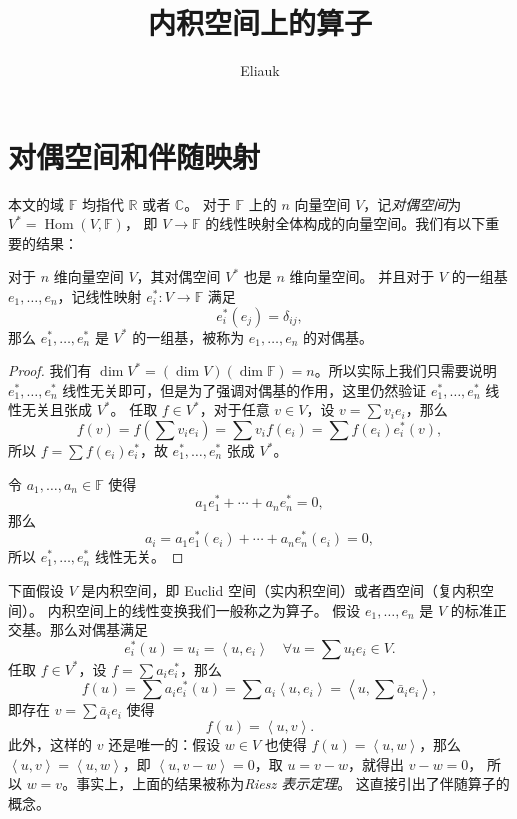 \documentclass[fontset=none,zihao=-4]{Notes}
\title{\sffamily 内积空间上的算子}
\author{Eliauk}
\DeclareMathOperator\Hom{Hom}
\newcommand{\inn}[1]{\left\langle#1\right\rangle}
\begin{document}
\maketitle

\tableofcontents

\section{对偶空间和伴随映射}

本文的域 $\mathbb{F}$ 均指代 $\mathbb{R}$ 或者 $\mathbb{C}$。
对于 $\mathbb{F}$ 上的 $n$ 向量空间 $V$，记\emph{对偶空间}为 $V^*=\Hom(V,\mathbb{F})$，
即 $V\to\mathbb{F}$ 的线性映射全体构成的向量空间。我们有以下重要的结果：

\begin{theorem}
  对于 $n$ 维向量空间 $V$，其对偶空间 $V^*$ 也是 $n$ 维向量空间。
  并且对于 $V$ 的一组基 $e_1,\dots,e_n$，记线性映射 $e_i^*:V\to\mathbb{F}$
  满足
  \[
    e_i^*(e_j)=\delta_{ij},  
  \]
  那么 $e_1^*,\dots,e_n^*$ 是 $V^*$ 的一组基，被称为 $e_1,\dots,e_n$
  的对偶基。
\end{theorem}
\begin{proof}
  我们有 $\dim V^*=(\dim V)(\dim\mathbb{F})=n$。所以实际上我们只需要说明 $e_1^*,\dots,e_n^*$
  线性无关即可，但是为了强调对偶基的作用，这里仍然验证 $e_1^*,\dots,e_n^*$ 线性无关且张成 $V^*$。
  任取 $f\in V^*$，对于任意 $v\in V$，设 $v=\sum v_ie_i$，那么
  \[
    f(v)=f\left(\sum v_ie_i\right)=\sum v_if(e_i)=\sum f(e_i)e_i^*(v),
  \]
  所以 $f=\sum f(e_i)e_i^*$，故 $e_1^*,\dots,e_n^*$ 张成 $V^*$。

  令 $a_1,\dots,a_n\in\mathbb{F}$ 使得
  \[
    a_1e_1^*+\cdots+a_ne_n^*=0,  
  \]
  那么
  \[
    a_i=a_1e_1^*(e_i)+\cdots+a_ne_n^*(e_i)=0,  
  \]
  所以 $e_1^*,\dots,e_n^*$ 线性无关。
\end{proof}

下面假设 $V$ 是内积空间，即 Euclid 空间（实内积空间）或者酉空间（复内积空间）。
内积空间上的线性变换我们一般称之为算子。
假设 $e_1,\dots,e_n$ 是 $V$ 的标准正交基。那么对偶基满足
\[
  e_i^*(u)  =u_i=\inn{u,e_i}\quad \forall u=\sum u_ie_i\in V.
\]
任取 $f\in V^*$，设 $f=\sum a_i e_i^*$，那么
\[
  f(u)=\sum a_i e_i^*(u)=\sum a_i\inn{u,e_i}=\inn{u,\sum \bar a_ie_i},  
\]
即存在 $v=\sum \bar a_ie_i$ 使得
\[
  f(u)=\inn{u,v}.  
\]
此外，这样的 $v$ 还是唯一的：假设 $w\in V$ 也使得 $f(u)=\inn{u,w}$，那么
$\inn{u,v}=\inn{u,w}$，即 $\inn{u,v-w}=0$，取 $u=v-w$，就得出 $v-w=0$，
所以 $w=v$。事实上，上面的结果被称为\emph{Riesz 表示定理}。
这直接引出了伴随算子的概念。
\end{document}

